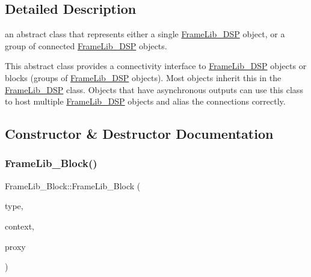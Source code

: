 \subsection{Detailed Description}
an abstract class that represents either a single \hyperlink{class_frame_lib___d_s_p}{Frame\+Lib\+\_\+\+D\+SP} object, or a group of connected \hyperlink{class_frame_lib___d_s_p}{Frame\+Lib\+\_\+\+D\+SP} objects. 

This abstract class provides a connectivity interface to \hyperlink{class_frame_lib___d_s_p}{Frame\+Lib\+\_\+\+D\+SP} objects or blocks (groups of \hyperlink{class_frame_lib___d_s_p}{Frame\+Lib\+\_\+\+D\+SP} objects). Most objects inherit this in the \hyperlink{class_frame_lib___d_s_p}{Frame\+Lib\+\_\+\+D\+SP} class. Objects that have asynchronous outputs can use this class to host multiple \hyperlink{class_frame_lib___d_s_p}{Frame\+Lib\+\_\+\+D\+SP} objects and alias the connections correctly. 

\subsection{Constructor \& Destructor Documentation}
\mbox{\label{class_frame_lib___block_a00c67dce2872ec851851570f32b2af5b}} 
\subsubsection{\texorpdfstring{Frame\+Lib\+\_\+\+Block()}{FrameLib\_Block()}}
{\footnotesize\ttfamily Frame\+Lib\+\_\+\+Block\+::\+Frame\+Lib\+\_\+\+Block (\begin{DoxyParamCaption}\item[{\hyperlink{_frame_lib___types_8h_a842c5e2e69277690b064bf363c017980}{Object\+Type}}]{type,  }\item[{\hyperlink{class_frame_lib___context}{Frame\+Lib\+\_\+\+Context}}]{context,  }\item[{\hyperlink{struct_frame_lib___proxy}{Frame\+Lib\+\_\+\+Proxy} $\ast$}]{proxy }\end{DoxyParamCaption})\hspace{0.3cm}{\ttfamily [inline]}}

\mbox{\label{class_frame_lib___block_a17c0048595334cb8d63abfcbb77c980d}} 
